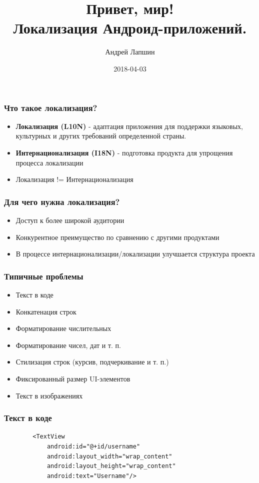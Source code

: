 \documentclass{beamer}
\author{Андрей Лапшин}
\date{2018-04-03}
\title{Привет, мир!\\Локализация Андроид-приложений.
}
\begin{document}
\begin{frame}
    \titlepage
\end{frame}

\begin{frame}
    \frametitle{Что такое локализация?}
    \begin{itemize}
        \item \textbf{Локализация (L10N)} - адаптация приложения для поддержки
            языковых, культурных и других требований определенной страны.
        \item \textbf{Интернационализация (I18N)} - подготовка продукта для
            упрощения процесса локализации
        \item Локализация != Интернационализация
    \end{itemize}
\end{frame}

\begin{frame}
    \frametitle{Для чего нужна локализация?}
    \begin{itemize}
        \item Доступ к более широкой аудитории
        \item Конкурентное преимущество по сравнению с другими продуктами
        \item В процессе интернационализации/локализации улучшается структура проекта
    \end{itemize}
\end{frame}

\begin{frame}
    \frametitle{Типичные проблемы}
    \begin{itemize}
        \item Текст в коде
        \item Конкатенация строк
        \item Форматирование числительных
        \item Форматирование чисел, дат и т. п.
        \item Стилизация строк (курсив, подчеркивание и т. п.)
        \item Фиксированный размер UI-элементов
        \item Текст в изображениях
    \end{itemize}
\end{frame}

\begin{frame}[fragile]
    \frametitle{Текст в коде}
    \begin{verbatim}
        <TextView
            android:id="@+id/username"
            android:layout_width="wrap_content"
            android:layout_height="wrap_content"
            android:text="Username"/>
    \end{verbatim}
\end{frame}
\end{document}
